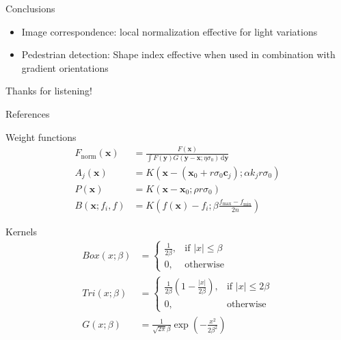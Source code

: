 \documentclass[14pt,t]{beamer}
\def\x{\mathbf{x}}
\def\y{\mathbf{y}}
\def\c{\mathbf{c}}
\begin{document}
%
\begin{frame}[c]{Conclusions}
\begin{itemize}
\item Image correspondence: local normalization effective for light variations
\vspace{1cm}
\item Pedestrian detection: Shape index effective when used in combination with gradient orientations
\end{itemize}
\end{frame}
%
\begin{frame}[c]
\begin{center}
\begin{huge}
Thanks for listening!
\end{huge}
\end{center}
\end{frame}
%
\begin{frame}{References}
\printbibliography
\end{frame}
%
\appendix
%
\begin{frame}{Weight functions}
\ghostframe
\setlength{\jot}{15pt}
\begin{align*}
F_\text{norm}(\x) &= \frac{F(\x)}{\int F(\y) G(\y - \x; \eta \sigma_0) \,\text{d} \y} \\
A_j(\x) &= K(\x - (\x_0 + r \sigma_0 \c_j); \alpha k_j r \sigma_0) \\
P(\x) &= K(\x - \x_0; \rho r \sigma_0) \\
B(\x; f_i, f) &= K \left( f(\x) - f_i; \beta \frac{f_\text{max} - f_\text{min}}{2n} \right)
\end{align*}
\end{frame}
%
\begin{frame}{Kernels}
\ghostframe
\setlength{\jot}{15pt}
\begin{align*}
\mathit{Box} (x; \beta) &= 
\begin{cases}
    \frac{1}{2 \beta},& \text{if } |x| \leq \beta \\
    0,              & \text{otherwise}
\end{cases} \\
\mathit{Tri} (x; \beta) &= 
\begin{cases}
    \frac{1}{2 \beta} \left( 1 - \frac{| x |}{2 \beta} \right) ,& \text{if } |x| \leq 2 \beta \\
    0,              & \text{otherwise}
\end{cases} \\
G(x;\beta) &= \frac{1}{\sqrt{2\pi} \beta}
\exp\left( -\frac{x^2}{2 \beta^2} \right)
\end{align*}
\end{frame}
%
\end{document}
